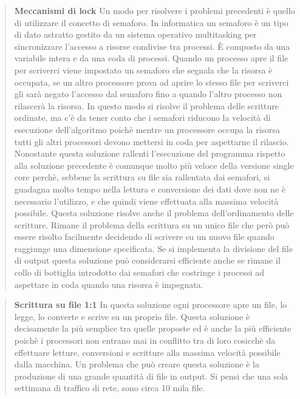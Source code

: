 \documentclass[../main.tex]{subfiles}
\begin{document}
\begin{verse}
\textbf{Meccanismi di lock}
Un modo per risolvere i problemi precedenti è quello di utilizzare il concetto di semaforo. 
In informatica un semaforo è un tipo di dato astratto gestito da un sistema operativo multitasking per sincronizzare l'accesso a risorse condivise tra processi. È composto da una variabile intera e da una coda di processi. Quando un processo apre il file per scriverci viene impostato un semaforo che segnala che la risorsa è occupata, se un altro processore prova ad aprire lo stesso file per scriverci gli sarà negato l'accesso dal semaforo fino a quando l'altro processo non rilascerà la risorsa.
In questo modo si risolve il problema delle scritture ordinate, ma c'è da tener conto che i semafori riducono la velocità di esecuzione dell'algoritmo poichè mentre un processore occupa la risorsa tutti gli altri processori devono mettersi in coda per aspettarne il rilascio. Nonostante questa soluzione rallenti l'esecuzione del programma rispetto alla soluzione precedente è comunque molto più veloce della versione single core perchè, sebbene la scrittura su file sia rallentata dai semafori, si guadagna molto tempo nella lettura e conversione dei dati dove non ne è necessario l'utilizzo, e che quindi viene effettuata alla massima velocità possibile. Questa soluzione risolve anche il problema dell'ordinamento delle scritture.
Rimane il problema della scrittura su un unico file che però può essere risolto facilmente decidendo di scrivere su un nuovo file quando raggiunge una dimensione specificata.
Se si implementa la divisione del file di output questa soluzione può considerarsi efficiente anche se rimane il collo di bottiglia introdotto dai semafori che costringe i processi ad aspettare in coda quando una risorsa è impegnata.
\end{verse}

\begin{verse}
\textbf{Scrittura su file 1:1}
In questa soluzione ogni processore apre un file, lo legge, lo converte e scrive su un proprio file.
Questa soluzione è decisamente la più semplice tra quelle proposte ed è anche la più efficiente poichè i processori non entrano mai in conflitto tra di loro cosicchè da effettuare letture, conversioni e scritture alla massima velocità possibile dalla macchina.
Un problema che può creare questa soluzione è la produzione di una grande quantità di file in output. Si pensi che una sola settimana di traffico di rete, sono circa 10 mila file.
\end{verse}
\end{document}

